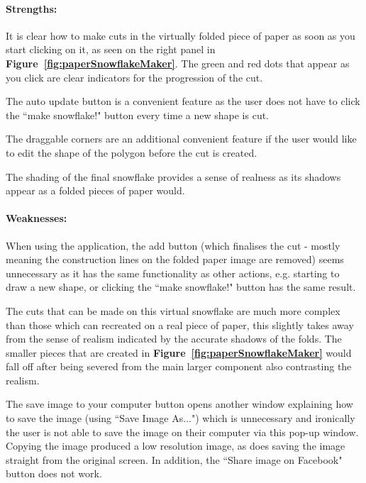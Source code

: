 \documentclass[11pt]{article}
\begin{document}
                \paragraph{Strengths:}
                It is clear how to make cuts in the virtually folded piece of paper as soon as you start clicking on it, as seen on the right panel in \textbf{Figure~\ref{fig:paperSnowflakeMaker}}. The green and red dots that appear as you click are clear indicators for the progression of the cut.
                
                The auto update button is a convenient feature as the user does not have to click the ``make snowflake!" button every time a new shape is cut. 
                
                The draggable corners are an additional convenient feature if the user would like to edit the shape of the polygon before the cut is created.
                 
                 The shading of the final snowflake provides a sense of realness as its shadows appear as a folded pieces of paper would.
                 
                \paragraph{Weaknesses:}
                When using the application, the add button (which finalises the cut - mostly meaning the construction lines on the folded paper image are removed) seems unnecessary as it has the same functionality as other actions, e.g. starting to draw a new shape, or clicking the ``make snowflake!" button has the same result.
                
                The cuts that can be made on this virtual snowflake are much more complex than those which can recreated on a real piece of paper, this slightly takes away from the sense of realism indicated by the accurate shadows of the folds. The smaller pieces that are created in \textbf{Figure~\ref{fig:paperSnowflakeMaker}} would fall off after being severed from the main larger component also contrasting the realism.
                
                The save image to your computer button opens another window explaining how to save the image (using ``Save Image As...") which is unnecessary and ironically the user is not able to save the image on their computer via this pop-up window. Copying the image produced a low resolution image, as does saving the image straight from the original screen. In addition, the ``Share image on Facebook" button does not work.
            
\end{document}
